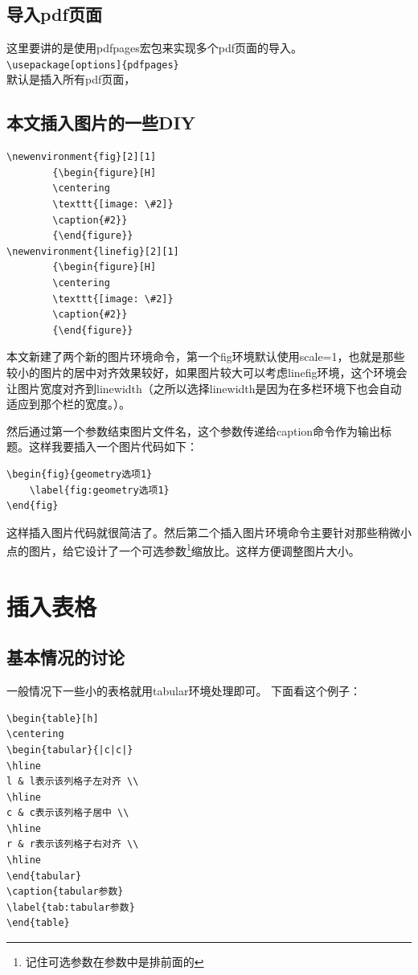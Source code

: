 \documentclass[11pt,oneside]{book}
\begin{document}
\begin{common-format}
\subsection{导入pdf页面}
这里要讲的是使用pdfpages宏包来实现多个pdf页面的导入。\\
\verb+\usepackage[options]{pdfpages} +\\
默认是插入所有pdf页面，

\subsection{本文插入图片的一些DIY}
\begin{Verbatim}
\newenvironment{fig}[2][1]
        {\begin{figure}[H]
        \centering
        \texttt{[image: \#2]}
        \caption{#2}}
        {\end{figure}}
\newenvironment{linefig}[2][1]
        {\begin{figure}[H]
        \centering
        \texttt{[image: \#2]}
        \caption{#2}}
        {\end{figure}}
\end{Verbatim}

本文新建了两个新的图片环境命令，第一个fig环境默认使用scale=1，也就是那些较小的图片的居中对齐效果较好，如果图片较大可以考虑linefig环境，这个环境会让图片宽度对齐到linewidth（之所以选择linewidth是因为在多栏环境下也会自动适应到那个栏的宽度。）。

然后通过第一个参数结束图片文件名，这个参数传递给caption命令作为输出标题。这样我要插入一个图片代码如下：
\begin{Verbatim}
\begin{fig}{geometry选项1}   
	\label{fig:geometry选项1}
\end{fig}
\end{Verbatim}
这样插入图片代码就很简洁了。然后第二个插入图片环境命令主要针对那些稍微小点的图片，给它设计了一个可选参数\footnote{记住可选参数在参数中是排前面的}缩放比。这样方便调整图片大小。

\section{插入表格}
\subsection{基本情况的讨论}
一般情况下一些小的表格就用tabular环境处理即可。
下面看这个例子：
\begin{Verbatim}
\begin{table}[h]
\centering
\begin{tabular}{|c|c|}
\hline
l & l表示该列格子左对齐 \\
\hline
c & c表示该列格子居中 \\
\hline
r & r表示该列格子右对齐 \\
\hline
\end{tabular}
\caption{tabular参数}
\label{tab:tabular参数}
\end{table}
\end{Verbatim}


\end{common-format}
\end{document}
